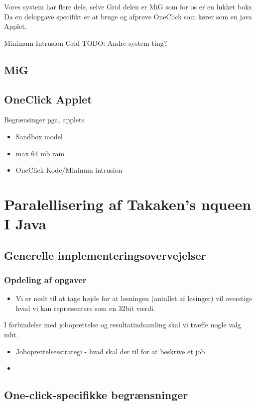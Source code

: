 \documentclass[a4,10pt]{article}
\begin{document}
Vores system har flere dele, selve Grid delen er MiG som for os er en lukket boks
Da en delopgave specifikt er at bruge og afprøve OneClick som kører som en java Applet.

Minimum Intrusion Grid
TODO: Andre system ting?
\subsection{MiG}\label{mig}




\subsection{OneClick Applet}\label{applet}
Begrænsinger pga, applets
\begin{itemize}
	\item Sandbox model
	\item max 64 mb ram
	\item OneClick Kode/Mininum intrusion
\end{itemize}

\section{Paralellisering af Takaken's nqueen I Java}

\subsection{Generelle implementeringsovervejelser}
\subsubsection{Opdeling af opgaver}

\begin{itemize}
\item{Vi er nødt til at tage højde for at løsningen (antallet af løsinger) vil overstige hvad vi kan repræsentere som en 32bit værdi. }
\end{itemize}

I forbindelse med joboprettelse og resultatindsamling skal vi træffe nogle valg mht.
\begin{itemize}
\item{Joboprettelsesstrategi - hvad skal der til for at beskrive et job.}
\item{}
\end{itemize}

\subsection{One-click-specifikke begrænsninger}
\end{document}

